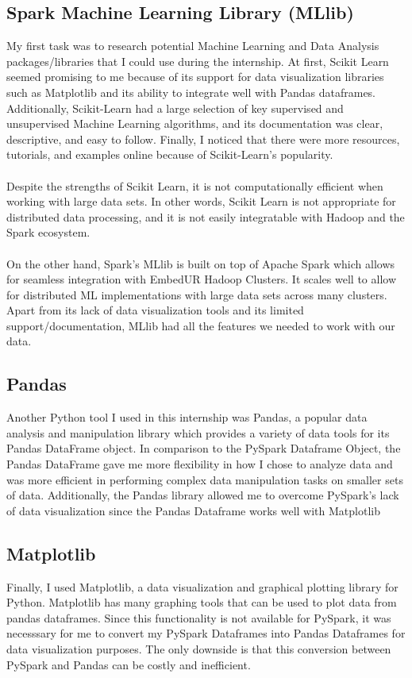\documentclass{article}
\begin{document}
\subsection{Spark Machine Learning Library (MLlib)}
My first task was to research potential Machine Learning and Data Analysis packages/libraries that I could use during the internship. At first, Scikit Learn seemed promising to me because of its support for data visualization libraries such as Matplotlib and its ability to integrate well with Pandas dataframes. Additionally, Scikit-Learn had a large selection of key supervised and unsupervised Machine Learning algorithms, and its documentation was clear, descriptive, and easy to follow. Finally, I noticed that there were more resources, tutorials, and examples online because of Scikit-Learn's popularity.
\\ \\
Despite the strengths of Scikit Learn, it is not computationally efficient when working with large data sets. In other words, Scikit Learn is not appropriate for distributed data processing, and it is not easily integratable with Hadoop and the Spark ecosystem.
\\ \\
On the other hand, Spark's MLlib is built on top of Apache Spark which allows for seamless integration with EmbedUR Hadoop Clusters. It scales well to allow for distributed ML implementations with large data sets across many clusters. Apart from its lack of data visualization tools and its limited support/documentation, MLlib had all the features we needed to work with our data. 

\subsection{Pandas}
Another Python tool I used in this internship was Pandas, a popular data analysis and manipulation library which provides a variety of data tools for its Pandas DataFrame object. In comparison to the PySpark Dataframe Object, the Pandas DataFrame gave me more flexibility in how I chose to analyze data and was more efficient in performing complex data manipulation tasks on smaller sets of data. Additionally, the Pandas library allowed me to overcome PySpark's lack of data visualization since the Pandas Dataframe works well with Matplotlib

\subsection{Matplotlib}
Finally, I used Matplotlib, a data visualization and graphical plotting library for Python. Matplotlib has many graphing tools that can be used to plot data from pandas dataframes. Since this functionality is not available for PySpark, it was necesssary for me to convert my PySpark Dataframes into Pandas Dataframes for data visualization purposes. The only downside is that this conversion between PySpark and Pandas can be costly and inefficient.
\end{document}
